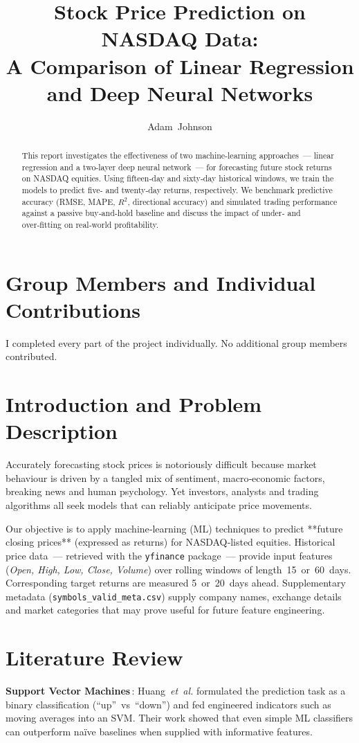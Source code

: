 \documentclass[sigconf]{acmart}
\title{Stock Price Prediction on NASDAQ Data:\\A Comparison of Linear Regression and Deep Neural Networks}
\author{Adam Johnson}
\affiliation{%
  \institution{University of Houston}
  \city{Houston}
  \state{TX}
  \country{USA}}
\begin{document}
\begin{abstract}
This report investigates the effectiveness of two machine‐learning approaches — linear regression and a two‑layer deep neural network — for forecasting future stock returns on NASDAQ equities.  Using fifteen‑day and sixty‑day historical windows, we train the models to predict five‑ and twenty‑day returns, respectively.  We benchmark predictive accuracy (RMSE, MAPE, $R^2$, directional accuracy) and simulated trading performance against a passive buy‑and‑hold baseline and discuss the impact of under‑ and over‑fitting on real‑world profitability.
\end{abstract}

\maketitle

\section{Group Members and Individual Contributions}
I completed every part of the project individually.  No additional group members contributed.

\section{Introduction and Problem Description}
Accurately forecasting stock prices is notoriously difficult because market behaviour is driven by a tangled mix of sentiment, macro‑economic factors, breaking news and human psychology.  Yet investors, analysts and trading algorithms all seek models that can reliably anticipate price movements.  

Our objective is to apply machine‑learning (ML) techniques to predict **future closing prices** (expressed as returns) for NASDAQ‑listed equities.  Historical price data — retrieved with the \texttt{yfinance} package — provide input features (\textit{Open, High, Low, Close, Volume}) over rolling windows of length 15 or 60 days.  Corresponding target returns are measured 5 or 20 days ahead.  Supplementary metadata (\texttt{symbols\_valid\_meta.csv}) supply company names, exchange details and market categories that may prove useful for future feature engineering.

\section{Literature Review}
\textbf{Support Vector Machines}\,\cite{huang2005svm}:  Huang \textit{et al.} formulated the prediction task as a binary classification (“up” vs “down”) and fed engineered indicators such as moving averages into an SVM.  Their work showed that even simple ML classifiers can outperform naïve baselines when supplied with informative features.
\end{document}
